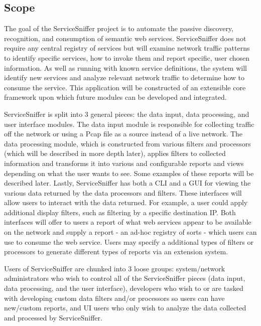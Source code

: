 \documentclass[titlepage]{article}
\begin{document}

\subsection{Scope%
  \label{scope}%
}

The goal of the ServiceSniffer project is to automate the passive discovery,
recognition, and consumption of semantic web services.  ServiceSniffer does not
require any central registry of services but will examine network traffic
patterns to identify specific services, how to invoke them and report
specific, user chosen information.  As well as running with known service
definitions, the system will identify new services and analyze
relevant network traffic to determine how to consume the service.  This
application will be constructed of an extensible core framework upon which
future modules can be developed and integrated.

ServiceSniffer is split into 3 general pieces: the data input, data processing,
and user interface modules.  The data input module is responsible for
collecting traffic off the network or using a Pcap file as a source instead of
a live network.  The data processing module, which is constructed from various
filters and processors (which will be described in more depth later), applies
filters to collected information and transforms it into
various and configurable reports and views depending on what the user wants to
see.  Some examples of these reports will be described later.  Lastly,
ServiceSniffer has both a CLI and a GUI for viewing the various data returned
by the data processors and filters.  These interfaces will allow users to
interact with the data returned.  For example, a user could apply additional
display filters, such as filtering by a specific destination IP.  Both
interfaces will offer to users a report of what web services appear to be
available on the network and supply a report - an ad-hoc registry of sorts -
which users can use to consume the web service.  Users may specify a additional
types of filters or processors to generate different types of reports via an
extension system.

Users of ServiceSniffer are chunked into 3 loose groups: system/network
administrators who wish to control all of the ServiceSniffer pieces (data
input, data processing, and the user interface), developers who wish to or are
tasked with developing custom data filters and/or processors so users can have
new/custom reports, and UI users who only wish to analyze the data collected
and processed by ServiceSniffer.
\end{document}
